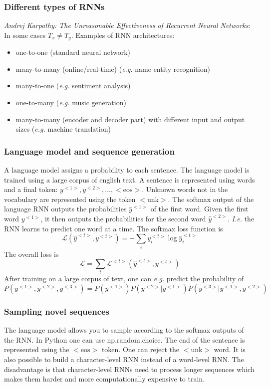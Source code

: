 \documentclass{article}
\begin{document}
\subsubsection{Different types of RNNs}
\emph{Andrej Karpathy: The Unreasonable Effectiveness of Recurrent Neural Networks}:
In some cases $T_x\neq T_y$.
Examples of RNN architectures:
\begin{itemize}
  \item one-to-one (standard neural network)
  \item many-to-many (online/real-time) (\emph{e.g.} name entity recognition)
  \item many-to-one (\emph{e.g.} sentiment analysis)
  \item one-to-many (\emph{e.g.} music generation)
  \item many-to-many (encoder and decoder part) with different input and output sizes (\emph{e.g.} machine translation)
\end{itemize}

\subsubsection{Language model and sequence generation}\label{cha:langmod}
A language model assigns a probability to each sentence.
The language model is trained using a large corpus of english text.
A sentence is represented using words and a final token: $y^{<1>}, y^{<2>},\ldots,\mathrm{<eos>}$.
Unknown words not in the vocabulary are represented using the token $\mathrm{<unk>}$.
The softmax output of the language RNN outputs the probabilities $\hat{y}^{<1>}$ of the first word.
Given the first word $y^{<1>}$, it then outputs the probabilities for the second word $\hat{y}^{<2>}$.
\emph{I.e.} the RNN learns to predict one word at a time.
The softmax loss function is
\begin{equation}
  \mathcal{L}(\hat{y}^{<t>},y^{<t>})=-\sum_i y^{<t>}_i \log \hat{y}^{<t>}_i
\end{equation}
The overall loss is
\begin{equation}
  \mathcal{L}=\sum_t\mathcal{L}^{<t>}(\hat{y}^{<t>},y^{<t>})
\end{equation}
After training on a large corpus of text,
one can \emph{e.g.} predict the probability of
\begin{equation}
  P(y^{<1>},y^{<2>},y^{<3>})=P(y^{<1>})P(y^{<2>}|y^{<1>})P(y^{<3>}|y^{<1>},y^{<2>})
\end{equation}

\subsubsection{Sampling novel sequences}
The language model allows you to sample according to the softmax outputs of the RNN.
In Python one can use np.random.choice.
The end of the sentence is represented using the $\mathrm{<eos>}$ token.
One can reject the $\mathrm{<unk>}$ word.
It is also possible to build a character-level RNN instead of a word-level RNN.
The disadvantage is that character-level RNNs need to process longer sequences which makes them harder and more computationally expensive to train.
\end{document}
